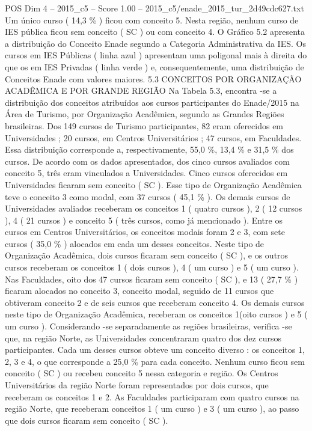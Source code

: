 \begin{textsample}{POS Dim 4 – 2015\_c5 – Score 1.00 – 2015\_c5/enade\_2015\_tur\_2d49cdc627.txt}
Um único curso ( 14,3 \% ) ficou com conceito 5.
Nesta região, nenhum curso de IES pública ficou sem conceito ( SC ) ou com conceito 4.
O Gráfico 5.2 apresenta a distribuição do Conceito Enade segundo a Categoria Administrativa da IES.
Os cursos em IES Públicas ( linha azul ) apresentam uma poligonal mais à direita do que os em IES Privadas ( linha verde ) e, consequentemente, uma distribuição de Conceitos Enade com valores maiores. 5.3 CONCEITOS POR ORGANIZAÇÃO ACADÊMICA E POR GRANDE REGIÃO Na Tabela 5.3, encontra -se a distribuição dos conceitos atribuídos aos cursos participantes do Enade/2015 na Área de Turismo, por Organização Acadêmica, segundo as Grandes Regiões brasileiras.
Dos 149 cursos de Turismo participantes, 82 eram oferecidos em Universidades ; 20 cursos, em Centros Universitários ; 47 cursos, em Faculdades.
Essa distribuição corresponde a, respectivamente, 55,0 \%, 13,4 \% e 31,5 \% dos cursos.
De acordo com os dados apresentados, dos cinco cursos avaliados com conceito 5, três eram vinculados a Universidades.
Cinco cursos oferecidos em Universidades ficaram sem conceito ( SC ).
Esse tipo de Organização Acadêmica teve o conceito 3 como modal, com 37 cursos ( 45,1 \% ).
Os demais cursos de Universidades avaliados receberam os conceitos 1 ( quatro cursos ), 2 ( 12 cursos ), 4 ( 21 cursos ) e conceito 5 ( três cursos, como já mencionado ).
Entre os cursos em Centros Universitários, os conceitos modais foram 2 e 3, com sete cursos ( 35,0 \% ) alocados em cada um desses conceitos.
Neste tipo de Organização Acadêmica, dois cursos ficaram sem conceito ( SC ), e os outros cursos receberam os conceitos 1 ( dois cursos ), 4 ( um curso ) e 5 ( um curso ).
Nas Faculdades, oito dos 47 cursos ficaram sem conceito ( SC ), e 13 ( 27,7 \% ) ficaram alocados no conceito 3, conceito modal, seguido de 11 cursos que obtiveram conceito 2 e de seis cursos que receberam conceito 4.
Os demais cursos neste tipo de Organização Acadêmica, receberam os conceitos 1(oito cursos ) e 5 ( um curso ).
Considerando -se separadamente as regiões brasileiras, verifica -se que, na região Norte, as Universidades concentraram quatro dos dez cursos participantes.
Cada um desses cursos obteve um conceito diverso : os conceitos 1, 2, 3 e 4, o que corresponde a 25,0 \% para cada conceito.
Nenhum curso ficou sem conceito ( SC ) ou recebeu conceito 5 nessa categoria e região.
Os Centros Universitários da região Norte foram representados por dois cursos, que receberam os conceitos 1 e 2.
As Faculdades participaram com quatro cursos na região Norte, que receberam conceitos 1 ( um curso ) e 3 ( um curso ), ao passo que dois cursos ficaram sem conceito ( SC ).

\end{textsample}
